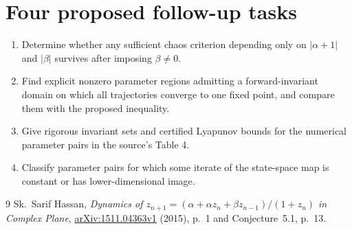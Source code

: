 \documentclass[11pt]{article}
\begin{document}
\section*{Four proposed follow-up tasks}
\begin{enumerate}
\item[Task 2.] Determine whether any sufficient chaos criterion depending
only on $|\alpha+1|$ and $|\beta|$ survives after imposing $\beta\ne0$.
\item[Task 3.] Find explicit nonzero parameter regions admitting a
forward-invariant domain on which all trajectories converge to one
fixed point, and compare them with the proposed inequality.
\item[Task 4.] Give rigorous invariant sets and certified Lyapunov
bounds for the numerical parameter pairs in the source's Table 4.
\item[Task 5.] Classify parameter pairs for which some iterate of the
state-space map is constant or has lower-dimensional image.
\end{enumerate}

\begin{thebibliography}{9}
 Sk.~Sarif Hassan,
\emph{Dynamics of $z_{n+1}=(\alpha+\alpha z_n+\beta z_{n-1})/(1+z_n)$
in Complex Plane},
\href{https://arxiv.org/abs/1511.04363v1}{arXiv:1511.04363v1} (2015),
p.~1 and Conjecture~5.1, p.~13.
\end{thebibliography}
\end{document}

